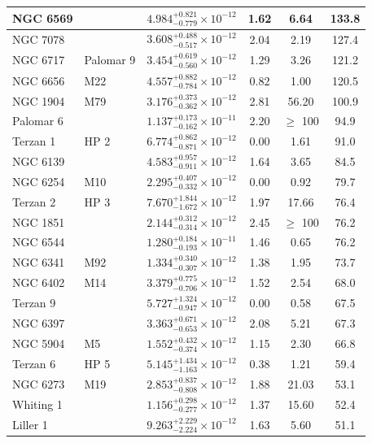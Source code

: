 \begin{longtable}{|l|l|l|c|c|c|}
NGC 6569 & & $4.984^{+0.821}_{-0.779} \times 10^{-12}$ & 1.62 & 6.64 & 133.8 \\\hline
NGC 7078 & & $3.608^{+0.488}_{-0.517} \times 10^{-12}$ & 2.04 & 2.19 & 127.4 \\\hline
NGC 6717 & Palomar 9& $3.454^{+0.619}_{-0.560} \times 10^{-12}$ & 1.29 & 3.26 & 121.2 \\\hline
NGC 6656 & M22 & $4.557^{+0.882}_{-0.784} \times 10^{-12}$ & 0.82 & 1.00 & 120.5 \\\hline
NGC 1904 & M79 & $3.176^{+0.373}_{-0.362} \times 10^{-12}$ & 2.81 & 56.20 & 100.9 \\\hline
Palomar 6 & & $1.137^{+0.173}_{-0.162} \times 10^{-11}$ & 2.20 & $\geq$ 100 & 94.9 \\\hline
Terzan 1 & HP 2 & $6.774^{+0.862}_{-0.871} \times 10^{-12}$ & 0.00 & 1.61 & 91.0 \\\hline
NGC 6139 & & $4.583^{+0.957}_{-0.911} \times 10^{-12}$ & 1.64 & 3.65 & 84.5 \\\hline
NGC 6254 & M10 & $2.295^{+0.407}_{-0.332} \times 10^{-12}$ & 0.00 & 0.92 & 79.7 \\\hline
Terzan 2 & HP 3 & $7.670^{+1.844}_{-1.672} \times 10^{-12}$ & 1.97 & 17.66 & 76.4 \\\hline
NGC 1851 & & $2.144^{+0.312}_{-0.314} \times 10^{-12}$ & 2.45 & $\geq$ 100 & 76.2 \\\hline
NGC 6544 & & $1.280^{+0.184}_{-0.193} \times 10^{-11}$ & 1.46 & 0.65 & 76.2 \\\hline
NGC 6341 & M92 & $1.334^{+0.340}_{-0.307} \times 10^{-12}$ & 1.38 & 1.95 & 73.7 \\\hline
NGC 6402 & M14 & $3.379^{+0.775}_{-0.706} \times 10^{-12}$ & 1.52 & 2.54 & 68.0 \\\hline
Terzan 9 & & $5.727^{+1.324}_{-0.947} \times 10^{-12}$ & 0.00 & 0.58 & 67.5 \\\hline
NGC 6397 & & $3.363^{+0.671}_{-0.653} \times 10^{-12}$ & 2.08 & 5.21 & 67.3 \\\hline
NGC 5904 & M5 & $1.552^{+0.432}_{-0.374} \times 10^{-12}$ & 1.15 & 2.30 & 66.8 \\\hline
Terzan 6 & HP 5 & $5.145^{+1.434}_{-1.163} \times 10^{-12}$ & 0.38 & 1.21 & 59.4 \\\hline
NGC 6273 & M19 & $2.853^{+0.837}_{-0.808} \times 10^{-12}$ & 1.88 & 21.03 & 53.1 \\\hline
Whiting 1 & & $1.156^{+0.298}_{-0.277} \times 10^{-12}$ & 1.37 & 15.60 & 52.4 \\\hline
Liller 1 & & $9.263^{+2.229}_{-2.224} \times 10^{-12}$ & 1.63 & 5.60 & 51.1 \\\hline

\end{longtable}
